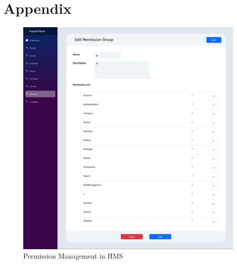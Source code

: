 \chapter*{Appendix}
\begin{figure}[h]
  \centering
  \includegraphics[width=1\linewidth]{contents/backmatter/images/PermissionManagement.jpeg}
  \caption{Permission Management in HMS}\label{fig:example}
\end{figure}
